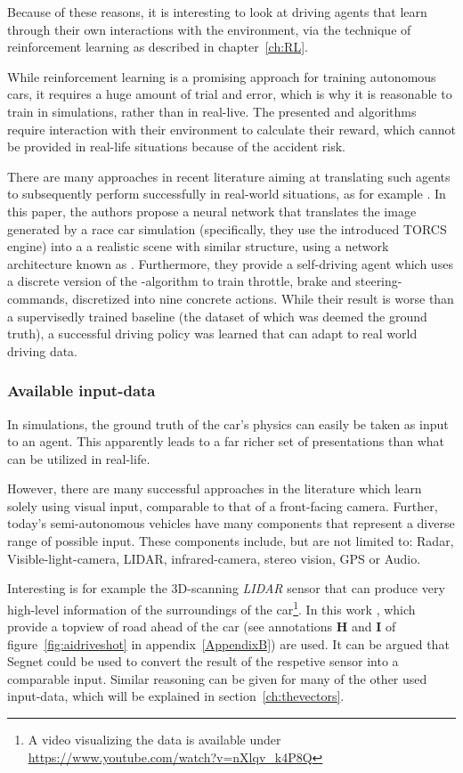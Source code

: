 Because of these reasons, it is interesting to look at driving agents that learn through their own interactions with the environment, via the technique of reinforcement learning as described in chapter~\ref{ch:RL}.

While reinforcement learning is a promising approach for training autonomous cars, it requires a huge amount of trial and error, which is why it is reasonable to train in simulations, rather than in real-live. The presented  and  algorithms require interaction with their environment to calculate their reward, which cannot be provided in real-life situations because of the accident risk.

There are many approaches in recent literature aiming at translating such agents to subsequently perform successfully in real-world situations, as for example \cite{you_virtual_2017}. In this paper, the authors propose a neural network that translates the image generated by a race car simulation (specifically, they use the introduced TORCS engine) into a a realistic scene with similar structure, using a network architecture known as \cite{badrinarayanan_segnet:_2015}. 
Furthermore, they provide a self-driving agent which uses a discrete version of the  \cite{mnih_asynchronous_2016}-algorithm to train throttle, brake and steering-commands, discretized into nine concrete actions. While their result is worse than a supervisedly trained baseline (the dataset of which was deemed the ground truth), a successful driving policy was learned that can adapt to real world driving data.

\subsubsection{Available input-data}

In simulations, the ground truth of the car's physics can easily be taken as input to an agent. This apparently leads to a far richer set of presentations than what can be utilized in real-life. 

However, there are many successful approaches in the literature which learn solely using visual input, comparable to that of a front-facing camera. Further, today's semi-autonomous vehicles have many components that represent a diverse range of possible input. These components include, but are not limited to: Radar, Visible-light-camera, LIDAR, infrared-camera, stereo vision, GPS or Audio. 

Interesting is for example the 3D-scanning \textit{LIDAR} sensor that can produce very high-level information of the surroundings of the car\footnote{A video visualizing the data is available under \url{https://www.youtube.com/watch?v=nXlqv_k4P8Q}}. In this work , which provide a topview of road ahead of the car (see annotations \textbf{H} and \textbf{I} of figure~\ref{fig:aidriveshot} in appendix~\ref{AppendixB}) are used. It can be argued that Segnet\cite{badrinarayanan_segnet:_2015} could be used to convert the result of the respetive sensor into a comparable input. Similar reasoning can be given for many of the other used input-data, which will be explained in section~\ref{ch:thevectors}.



